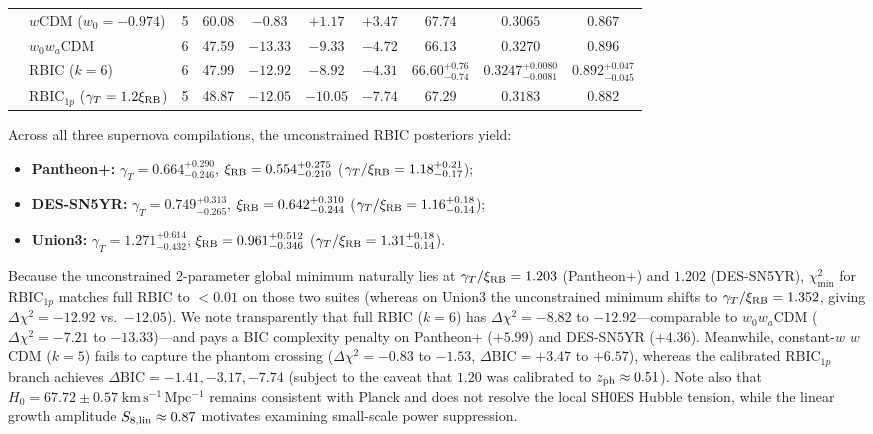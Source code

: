 \documentclass[preprint,12pt]{elsarticle}
\begin{document}
\begin{table}[t]
{\begin{tabular}{llcccccccc}
                     & $w$CDM ($w_0=-0.974$) & 5 & 60.08 & $-0.83$ & $+1.17$ & $+3.47$ & $67.74$ & $0.3065$ & $0.867$ \\
                     & $w_0 w_a$CDM & 6 & 47.59 & $-13.33$ & $-9.33$ & $-4.72$ & $66.13$ & $0.3270$ & $0.896$ \\
                     & RBIC ($k=6$) & 6 & 47.99 & $-12.92$ & $-8.92$ & $-4.31$ & $66.60^{+0.76}_{-0.74}$ & $0.3247^{+0.0080}_{-0.0081}$ & $0.892^{+0.047}_{-0.045}$ \\
                     & $\mathrm{RBIC}_{1p}$ ($\gamma_T = 1.2\xi_{\rm RB}$) & 5 & 48.87 & $-12.05$ & $\mathbf{-10.05}$ & $\mathbf{-7.74}$ & $67.29$ & $0.3183$ & $0.882$ \\
\bottomrule
\end{tabular}}
\end{table}

Across all three supernova compilations, the unconstrained RBIC posteriors yield:
\begin{itemize}
    \item \textbf{Pantheon+:} $\gamma_T = 0.664^{+0.290}_{-0.246}$, $\xi_{\rm RB} = 0.554^{+0.275}_{-0.210}$ ($\gamma_T/\xi_{\rm RB} = 1.18^{+0.21}_{-0.17}$);
    \item \textbf{DES-SN5YR:} $\gamma_T = 0.749^{+0.313}_{-0.265}$, $\xi_{\rm RB} = 0.642^{+0.310}_{-0.244}$ ($\gamma_T/\xi_{\rm RB} = 1.16^{+0.18}_{-0.14}$);
    \item \textbf{Union3:} $\gamma_T = 1.271^{+0.614}_{-0.432}$, $\xi_{\rm RB} = 0.961^{+0.512}_{-0.346}$ ($\gamma_T/\xi_{\rm RB} = 1.31^{+0.18}_{-0.14}$).
\end{itemize}
Because the unconstrained 2-parameter global minimum naturally lies at $\gamma_T/\xi_{\rm RB} = 1.203$ (Pantheon+) and $1.202$ (DES-SN5YR), $\chi^2_{\min}$ for $\mathrm{RBIC}_{1p}$ matches full RBIC to $<0.01$ on those two suites (whereas on Union3 the unconstrained minimum shifts to $\gamma_T/\xi_{\rm RB} = 1.352$, giving $\Delta\chi^2 = -12.92$ vs.\ $-12.05$). We note transparently that full RBIC ($k=6$) has $\Delta\chi^2 = -8.82$ to $-12.92$—comparable to $w_0w_a$CDM ($\Delta\chi^2 = -7.21$ to $-13.33$)—and pays a BIC complexity penalty on Pantheon+ ($+5.99$) and DES-SN5YR ($+4.36$). Meanwhile, constant-$w$ $w$CDM ($k=5$) fails to capture the phantom crossing ($\Delta\chi^2 = -0.83$ to $-1.53$, $\Delta\mathrm{BIC} = +3.47$ to $+6.57$), whereas the calibrated $\mathrm{RBIC}_{1p}$ branch achieves $\Delta\mathrm{BIC} = -1.41, -3.17, -7.74$ (subject to the caveat that $1.20$ was calibrated to $z_{\rm ph} \approx 0.51$). Note also that $H_0 = 67.72 \pm 0.57\;\mathrm{km\,s^{-1}\,Mpc^{-1}}$ remains consistent with Planck and does not resolve the local SH0ES Hubble tension, while the linear growth amplitude $S_{8,\rm lin} \approx 0.87$ motivates examining small-scale power suppression.
\end{document}
